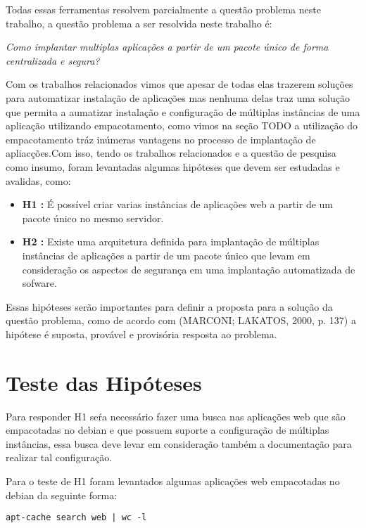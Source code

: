 Todas essas ferramentas resolvem parcialmente a questão problema neste trabalho,
a questão problema a ser resolvida neste trabalho é:

\begin{center}
  \textit{
    Como implantar multiplas aplicações a partir de um pacote único
    de forma centralizada e segura?
}
\end{center}

Com os trabalhos relacionados vimos que apesar de todas elas trazerem soluções
para automatizar instalação de aplicações mas nenhuma delas traz uma solução que
permita a aumatizar instalação e configuração de múltiplas instâncias de uma aplicação
utilizando empacotamento, como vimos na seção TODO a utilização do empacotamento
tráz inúmeras vantagens no processo de implantação de apliacções.Com isso, tendo
os trabalhos relacionados e a questão de pesquisa como insumo,
foram levantadas algumas hipóteses que devem ser estudadas e avalidas, como:

\begin{itemize}
  \item  \textbf{H1 :} É possível criar varias instâncias de aplicações
  web a partir de um pacote único no mesmo servidor.
   \item  \textbf{H2 :} Existe uma arquitetura definida para implantação de
   múltiplas instâncias de aplicações a partir de um pacote único que levam em consideração
   os aspectos de segurança em uma implantação automatizada de sofware.
\end{itemize}

Essas hipóteses serão importantes para definir a proposta para a solução da questão
problema, como de acordo com (MARCONI; LAKATOS, 2000, p. 137) a hipótese
é suposta, provável e provisória resposta ao problema.

\section{Teste das Hipóteses}

Para responder H1 seŕa necessário fazer uma busca nas aplicações web que são
empacotadas no debian e que possuem suporte a configuração de múltiplas instâncias,
essa busca deve levar em consideração também a documentação para realizar tal
configuração.

Para o teste de H1 foram levantados algumas aplicações web empacotadas no debian
da seguinte forma:

\begin{verbatim}
apt-cache search web | wc -l
\end{verbatim}

